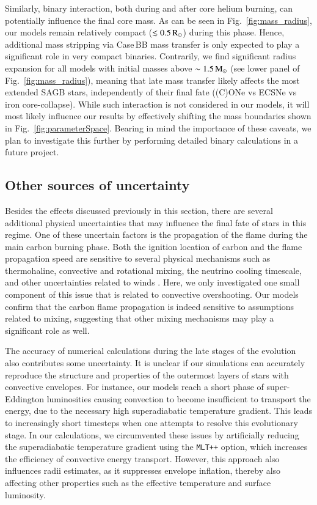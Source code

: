\documentclass[main.tex]{subfiles}
\begin{document}
Similarly, binary interaction, both during and after core helium burning, can 
potentially influence the final core mass. As can be seen in Fig.~\ref{fig:mass_radius}, our models remain relatively compact ($\lesssim 0.5\mathrm{\,R_\odot}$) during this phase. Hence, additional mass stripping via Case\,BB mass transfer is only expected to play a significant role in very compact binaries. 
Contrarily, we find significant radius expansion for all models with initial masses above $\sim 1.5\mathrm{\,M_\odot}$ (see lower panel of Fig.~\ref{fig:mass_radius}), meaning that late mass transfer likely affects the most extended SAGB stars, independently of their final fate ((C)ONe \ias vs ECSNe vs iron core-collapse). While such interaction is not considered in our models, it will most likely influence our results by effectively shifting  the mass boundaries shown in Fig.~\ref{fig:parameterSpace}. 
Bearing in mind the importance of these caveats, we plan to investigate this further by performing detailed binary calculations in a future project.


\subsection{Other sources of uncertainty}\label{sec:ch2:uncertainties}

Besides the effects discussed previously in this section, there are several additional physical uncertainties that may influence the final fate of stars in this regime. 
One of these uncertain factors is the propagation of the flame during the main  carbon burning phase. 
Both the ignition location of carbon and the flame propagation speed are sensitive to several physical mechanisms such as 
thermohaline, convective and rotational mixing, the neutrino cooling timescale, and other uncertainties related to winds 
\citep[][and references therein]{Farmer:2015afs}. 
Here, we only investigated one small component of this issue that is related to convective overshooting. 
Our models confirm that the carbon flame propagation is indeed sensitive to assumptions related to mixing, 
suggesting that other mixing mechanisms may  play a significant role as well. 

The accuracy of numerical calculations during the late stages of the evolution also contributes some uncertainty. It is unclear if our simulations can accurately reproduce the structure and properties of the outermost layers of stars with convective envelopes. For instance, our models reach a short phase of super-Eddington luminosities causing convection to become insufficient to transport the energy, due to the necessary high superadiabatic temperature gradient. This leads to increasingly short timesteps when one attempts to resolve this evolutionary stage. 
In our calculations, we circumvented  these issues by artificially reducing the superadiabatic temperature gradient using the \texttt{MLT++} option, which increases the efficiency of convective energy transport. 
However, this approach also influences radii  estimates, as it suppresses envelope inflation, thereby also affecting other properties such as the effective temperature and surface luminosity. 
\end{document}

